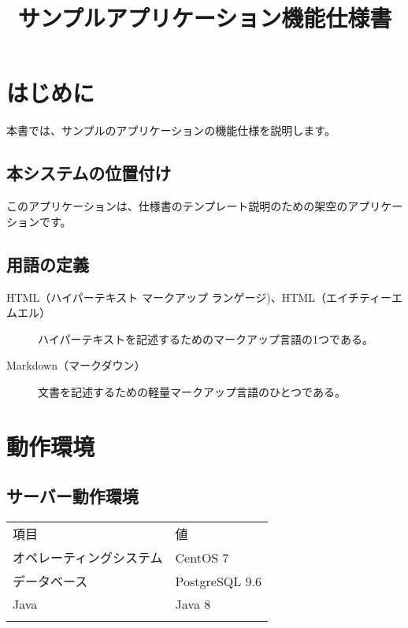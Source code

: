 \documentclass[11pt,a4j]{ltjsarticle}
\title{サンプルアプリケーション機能仕様書}
\date{\西暦{\today}}
\begin{document}
\maketitle

{
\setcounter{tocdepth}{3}
\tableofcontents
}
\section{はじめに}\label{ux306fux3058ux3081ux306b}

本書では、サンプルのアプリケーションの機能仕様を説明します。

\subsection{本システムの位置付け}\label{ux672cux30b7ux30b9ux30c6ux30e0ux306eux4f4dux7f6eux4ed8ux3051}

このアプリケーションは、仕様書のテンプレート説明のための架空のアプリケーションです。

\subsection{用語の定義}\label{ux7528ux8a9eux306eux5b9aux7fa9}

\begin{description}
\item[HTML（ハイパーテキスト マークアップ
ランゲージ)、HTML（エイチティーエムエル）]
ハイパーテキストを記述するためのマークアップ言語の1つである。
\item[Markdown（マークダウン）]
文書を記述するための軽量マークアップ言語のひとつである。
\end{description}

\section{動作環境}\label{ux52d5ux4f5cux74b0ux5883}

\subsection{サーバー動作環境}\label{ux30b5ux30fcux30d0ux30fcux52d5ux4f5cux74b0ux5883}

\begin{longtable}[c]{@{}ll@{}}
\toprule\addlinespace
項目 & 値
\\\addlinespace
\midrule\endhead
オペレーティングシステム & CentOS 7
\\\addlinespace
データベース & PostgreSQL 9.6
\\\addlinespace
Java & Java 8
\\\addlinespace
\bottomrule
\end{longtable}
\end{document}
